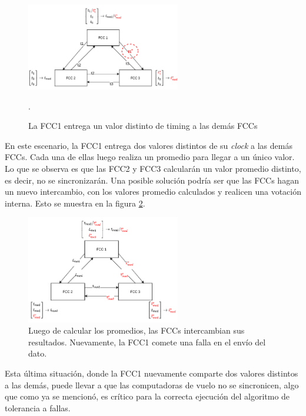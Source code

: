 \begin{figure}[H]
    \centering
    \includegraphics[width=0.6\textwidth]{img/3_4_2_consenso_4.png}
    \caption{La FCC1 entrega un valor distinto de timing a las demás FCCs}.
    \label{fig:3_4_2_consenso_4}
\end{figure}

En este escenario, la FCC1 entrega dos valores distintos de su \textit{clock} a las demás FCCs. Cada una de ellas luego realiza un promedio para llegar a un único valor. Lo que se observa es que las FCC2 y FCC3 calcularán un valor promedio distinto, es decir, no se sincronizarán.
Una posible solución podría ser que las FCCs hagan un nuevo intercambio, con los valores promedio calculados y realicen una votación interna. Esto se muestra en la figura \ref{fig:3_4_2_consenso_5}.

\begin{figure}[H]
    \centering
    \includegraphics[width=0.6\textwidth]{img/3_4_2_consenso_5.png}
    \caption{Luego de calcular los promedios, las FCCs intercambian sus resultados. Nuevamente, la FCC1 comete una falla en el envío del dato.}
    \label{fig:3_4_2_consenso_5}
\end{figure}

Esta última situación, donde la FCC1 nuevamente comparte dos valores distintos a las demás, puede llevar a que las computadoras de vuelo no se sincronicen, algo que como ya se mencionó, es crítico para la correcta ejecución del algoritmo de tolerancia a fallas.

